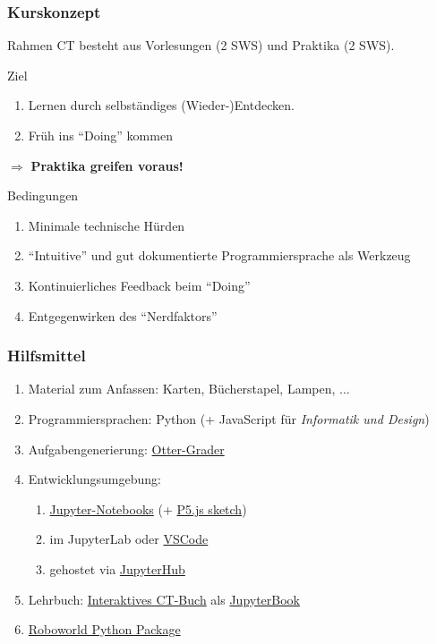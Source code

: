 \documentclass[german,aspectratio=169]{beamer}
\begin{document}
\begin{frame}
	\frametitle{Kurskonzept}
	\begin{block}{Rahmen}
		CT besteht aus Vorlesungen (2 SWS) und Praktika (2 SWS).
	\end{block}
	\begin{block}{Ziel}
		\begin{enumerate}[label = $\bullet$]
			\item Lernen durch selbständiges (Wieder-)Entdecken.
			\item Früh ins ``Doing'' kommen
		\end{enumerate}
	 $\Rightarrow$ \textbf{Praktika greifen voraus!}
	\end{block}
	\begin{block}{Bedingungen}
		\begin{enumerate}[label = $\bullet$]
			\item Minimale technische Hürden
			\item ``Intuitive'' und gut dokumentierte Programmiersprache als Werkzeug
			\item Kontinuierliches Feedback beim ``Doing''
			\item Entgegenwirken des ``Nerdfaktors''
		\end{enumerate}
	\end{block}
\end{frame}

\begin{frame}
	\frametitle{Hilfsmittel}
	\begin{enumerate}[label = $\bullet$]
		\item Material zum Anfassen: Karten, Bücherstapel, Lampen, $\ldots$
		\item Programmiersprachen: Python (+ JavaScript für \textit{Informatik und Design})
		\item Aufgabengenerierung: \href{https://otter-grader.readthedocs.io/en/latest/}{Otter-Grader}
		\item Entwicklungsumgebung: 
		\begin{enumerate}[label = $\bullet$]
			\item \href{https://jupyter.org/}{Jupyter-Notebooks} (+ \href{https://p5js.org/get-started/}{P5.js sketch})
			\item im JupyterLab oder \href{https://code.visualstudio.com/}{VSCode}
			\item gehostet via \href{https://jupyter.org/hub}{JupyterHub}
		\end{enumerate}
		\item Lehrbuch: \href{https://bzoennchen.github.io/ct-book/intro.html}{Interaktives CT-Buch} als \href{https://jupyterbook.org/en/stable/intro.html}{JupyterBook}
		\item \href{https://robo-world-doc.readthedocs.io/en/latest/index.html}{Roboworld Python Package}
	\end{enumerate}
\end{frame}
\end{document}
